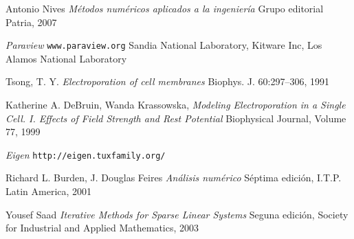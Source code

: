 \begin{thebibliography}{99}
	Antonio Nives
	\emph{Métodos numéricos aplicados a la ingeniería}
	Grupo editorial Patria,
	2007

	\emph{Paraview}
	\texttt{www.paraview.org}
	Sandia National Laboratory, Kitware Inc, Los Alamos National Laboratory


	Tsong, T. Y.
	\emph{Electroporation of cell membranes}
	Biophys. J. 60:297–306, 1991

	Katherine A. DeBruin, Wanda Krassowska, 
	\emph{Modeling Electroporation in a Single Cell. I. Effects of Field Strength and
Rest Potential}
	Biophysical Journal, Volume 77, 1999
	
	\emph{Eigen}
	\texttt{http://eigen.tuxfamily.org/}
	
	Richard L. Burden, J. Douglas Feires
	\emph{Análisis numérico}
	Séptima edición, I.T.P. Latin America, 2001

	Yousef Saad
	\emph{Iterative Methods for Sparse Linear Systems}
	Seguna edición, Society for Industrial and Applied Mathematics, 2003
	
\end{thebibliography}
